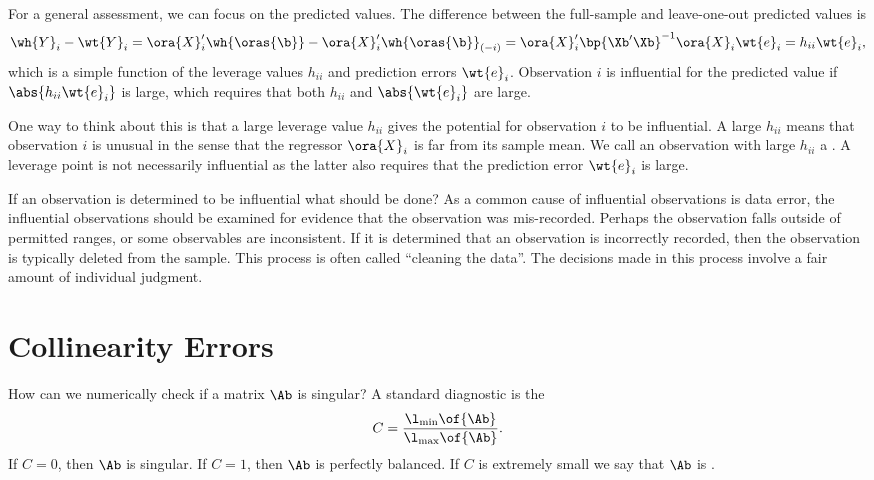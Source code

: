 For a general assessment, we can focus on the predicted values. The difference between the full-sample and leave-one-out predicted values is 
\begin{equation}
    \notag
    \wh{Y}_i -\wt{Y}_i = \ora{X}_i^\prime\wh{\oras{\b}} - \ora{X}_i^\prime\wh{\oras{\b}}_{(-i)} = \ora{X}_i^\prime\bp{\Xb^\prime \Xb}^{-1} \ora{X}_i \wt{e}_i = h_{ii} \wt{e}_i,
\end{equation}
which is a simple function of the leverage values $h_{ii}$ and prediction errors $\wt{e}_i$. Observation $i$ is influential for the predicted value if $\abs{h_{ii} \wt{e}_i}$ is large, which requires that both $h_{ii}$ and $\abs{\wt{e}_i}$ are large.

One way to think about this is that a large leverage value $h_{ii}$ gives the potential for observation $i$ to be influential. A large $h_{ii}$ means that observation $i$ is unusual in the sense that the regressor $\ora{X}_i$ is far from its sample mean. We call an observation with large $h_{ii}$ a . A leverage point is not necessarily influential as the latter also requires that the prediction error $\wt{e}_i$ is large.

If an observation is determined to be influential what should be done? As a common cause of influential observations is data error, the influential observations should be examined for evidence that the observation was mis-recorded. Perhaps the observation falls outside of permitted ranges, or some observables are inconsistent. If it is determined that an observation is incorrectly recorded, then the observation is typically deleted from the sample. This process is often called ``cleaning the data''. The decisions made in this process involve a fair amount of individual judgment. 



\section{Collinearity Errors}

How can we numerically check if a matrix $\Ab$ is singular? A  standard diagnostic is the 
\begin{equation}
    \notag
    C = \frac{\l_{\min}\of{\Ab}}{\l_{\max}\of{\Ab}}.
\end{equation}
If $C=0$, then $\Ab$ is singular. If $C=1$, then $\Ab$ is perfectly balanced. If $C$ is extremely small we say that $\Ab$ is .

